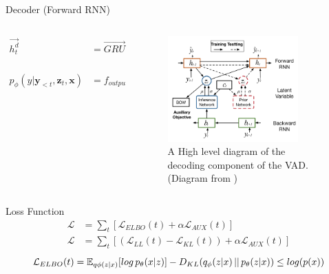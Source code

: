 \documentclass[aspectratio=169, 11pt]{beamer}
\begin{document}
\begin{frame}{Decoder (Forward RNN)}
  \begin{columns}
    \begin{column}{0.5\textwidth}
      \begin{equation}
        \begin{split}
          \overrightarrow{h^d_t} &= \overrightarrow{GRU}([y_{t-1},c_t,z_t], \overrightarrow{h^d_{t-1}}) \\
          p_\phi(y|\boldsymbol{y}_{<t},\boldsymbol{z}_t, \boldsymbol{x}) &= f_{output}([\overrightarrow{h^d_t}, c_t])
        \end{split}
      \end{equation}
    \end{column}
    \begin{column}{0.5\textwidth}  %
      \begin{figure}[!ht]
        \centering
        \includegraphics[width=50mm]{diagrams/vad_decoder.png}
        \caption{A High level diagram of the decoding component of the VAD. (Diagram from \cite{du_variational_2018})\label{r:vad_decoder}}
        \end{figure}
    \end{column}
    \end{columns}
  \end{frame}

\begin{frame}{Loss Function}
  \begin{equation}
    \begin{split} 
      \mathcal{L} &= \sum_t [\mathcal{L}_{ELBO}(t) + \alpha \mathcal{L}_{AUX}(t)] \\
      \mathcal{L} &= \sum_t [(\mathcal{L}_{LL}(t) - \mathcal{L}_{KL}(t)) + \alpha \mathcal{L}_{AUX}(t)] 
    \end{split}
  \end{equation}
  \begin{equation}
    \label{eqn:elbo}
    \mathcal{L}_{ELBO}(t) = \mathbb{E}_{q \phi (z|x)}[log \thinspace p_{\theta}(x|z)] - D_{KL}(q_{\phi}(z|x)\thinspace||\thinspace p_\theta(z|x)) \leq log (p(x))
  \end{equation}
  
\end{frame}
\end{document}
